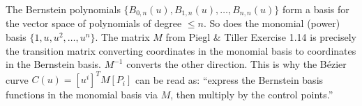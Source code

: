 \begin{remark*}
The Bernstein polynomials $\{B_{0,n}(u), B_{1,n}(u), \ldots, B_{n,n}(u)\}$ form a
basis for the vector space of polynomials of degree $\leq n$.
So does the monomial (power) basis $\{1, u, u^2, \ldots, u^n\}$.
The matrix $M$ from Piegl \& Tiller Exercise 1.14 is precisely the transition
matrix converting coordinates in the monomial basis to coordinates in the Bernstein basis.
$M^{-1}$ converts the other direction.
This is why the Bézier curve $C(u) = [u^i]^T M [P_i]$ can be read as:
``express the Bernstein basis functions in the monomial basis via $M$, then
multiply by the control points.''
\end{remark*}
